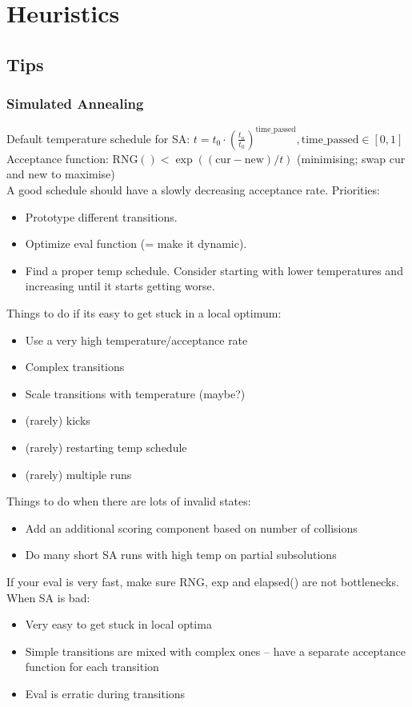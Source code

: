 \chapter{Heuristics}

\section{Tips}
	\subsection{Simulated Annealing}
	Default temperature schedule for SA: $t = t_0 \cdot (\frac{t_n}{t_0})^{\text{time\_passed}}, \text{time\_passed} \in [0, 1]$ \\
	Acceptance function: $\text{RNG}() < \exp((\text{cur} - \text{new}) / t)$ (minimising; swap cur and new to maximise) \\
	A good schedule should have a slowly decreasing acceptance rate. 
	Priorities:
	\begin{itemize}
		\item Prototype different transitions.
		\item Optimize eval function (= make it dynamic).
		\item Find a proper temp schedule. Consider starting with lower temperatures and increasing until it starts getting worse.
	\end{itemize}
	Things to do if its easy to get stuck in a local optimum:
	\begin{itemize}
		\item Use a very high temperature/acceptance rate
		\item Complex transitions
		\item Scale transitions with temperature (maybe?)
		\item (rarely) kicks
		\item (rarely) restarting temp schedule
		\item (rarely) multiple runs
	\end{itemize}
	Things to do when there are lots of invalid states:
	\begin{itemize}
		\item Add an additional scoring component based on number of collisions
		\item Do many short SA runs with high temp on partial subsolutions
	\end{itemize}
	If your eval is very fast, make sure RNG, exp and elapsed() are not bottlenecks.
	When SA is bad:
	\begin{itemize}
		\item Very easy to get stuck in local optima
		\item Simple transitions are mixed with complex ones -- have a separate acceptance function for each transition
		\item Eval is erratic during transitions
	\end{itemize}
